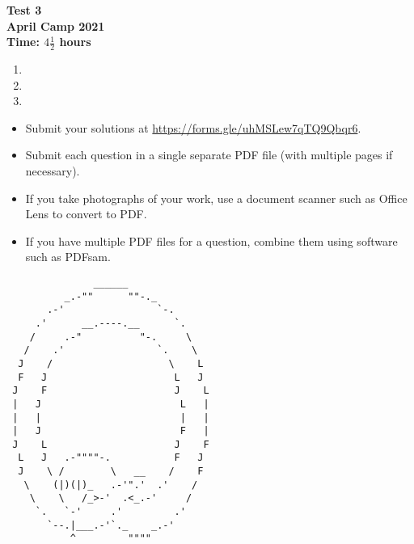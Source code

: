 \documentclass{article}
\begin{document}
\thispagestyle{empty}

\begin{center}
  \textbf{\Large Test 3}
  \\ \vspace{1em}
  \textbf{\large April Camp 2021}
  \\ \vspace{1em}
  \textbf{\large Time: $4\frac{1}{2}$ hours}
\end{center}

\vspace{24pt}

\begin{enumerate}[itemsep=18pt]

\item


\item


\item

\end{enumerate}


\vfill
\begin{itemize}
	\item Submit your solutions at \url{https://forms.gle/uhMSLew7qTQ9Qbqr6}.
	\item Submit each question in a single separate PDF file (with multiple pages if necessary).
	\item If you take photographs of your work, use a document scanner such as Office Lens to convert to PDF.
	\item If you have multiple PDF files for a question, combine them using software such as PDFsam.
\end{itemize}

\vfill
\centering
\begin{BVerbatim}
               ______
          _.-""      ""-._
       .-'                `-.
     .'      __.----.__      `.
    /     .-"          "-.     \
   /    .'                `.    \
  J    /                    \    L
  F   J                      L   J
 J    F                      J    L
 |   J                        L   |
 |   |                        |   |
 |   J                        F   |
 J    L                      J    F
  L   J   .-""""-.           F   J
  J    \ /        \   __    /    F
   \    (|)(|)_   .-'".'  .'    /
    \    \   /_>-'  .<_.-'     /
     `.   `-'     .'         .'
       `--.|___.-'`._    _.-'
           ^         """"
\end{BVerbatim}
\end{document}
